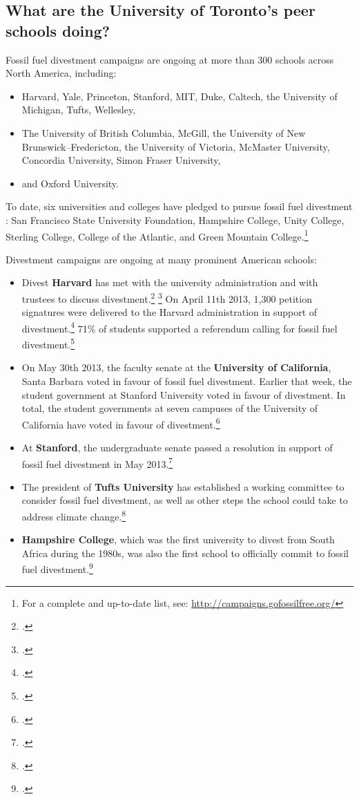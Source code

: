 	
	\subsection{What are the University of Toronto's peer schools doing?}
	\label{PeerSchools}



Fossil fuel divestment campaigns are ongoing at more than 300 schools across North America, including:
\begin{itemize}
	\item Harvard, Yale, Princeton, Stanford, MIT, Duke, Caltech, the University of Michigan, Tufts, Wellesley,
	\item The University of British Columbia, McGill, the University of New Brunswick--Fredericton, the University of Victoria, McMaster University, Concordia University, Simon Fraser University,
	\item and Oxford University.
\end{itemize}
To date, six universities and colleges have pledged to pursue fossil fuel divestment : San Francisco State University Foundation, Hampshire College, Unity College, Sterling College, College of the Atlantic, and Green Mountain College.\footnote{For a complete and up-to-date list, see: \url{http://campaigns.gofossilfree.org/}}


Divestment campaigns are ongoing at many prominent American schools:
\begin{itemize}
	\item Divest \textbf{Harvard} has met with the university administration and with trustees to discuss divestment.\footcite[][]{HarvardMeeting} \footcite[][]{HarvardTrustees} On April 11th 2013, 1,300 petition signatures were delivered to the Harvard administration in support of divestment.\footcite[][]{HarvardPetition} 71\% of students supported a referendum calling for fossil fuel divestment.\footcite[][]{StudentsClamoring}
	\item On May 30th 2013, the faculty senate at the \textbf{University of California}, Santa Barbara voted in favour of fossil fuel divestment. Earlier that week, the student government at Stanford University voted in favour of divestment. In total, the student governments at seven campuses of the University of California have voted in favour of divestment.\footcite[][]{UCSB2013}
	\item At \textbf{Stanford}, the undergraduate senate passed a resolution in support of fossil fuel divestment in May 2013.\footcite[][]{StanfordSenate}
	\item The president of \textbf{Tufts University} has established a working committee to consider fossil fuel divestment, as well as other steps the school could take to address climate change.\footcite[][]{TuftsDivest}
	\item \textbf{Hampshire College}, which was the first university to divest from South Africa during the 1980s, was also the first school to officially commit to fossil fuel divestment.\footcite[][]{StudentsClamoring}
\end{itemize}



